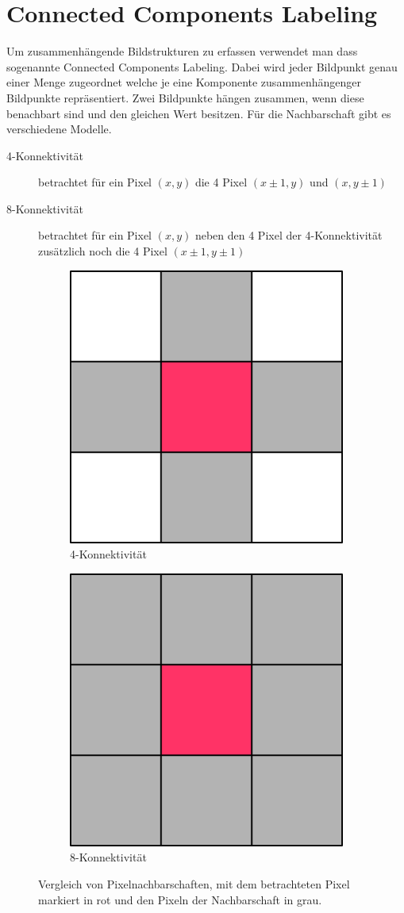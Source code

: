 \section{Connected Components Labeling}
\writtenby{\dcauthornameewie}%
Um zusammenhängende Bildstrukturen zu erfassen verwendet man dass sogenannte Connected Components Labeling.
Dabei wird jeder Bildpunkt genau einer Menge zugeordnet welche je eine Komponente zusammenhängenger Bildpunkte repräsentiert.
Zwei Bildpunkte hängen zusammen, wenn diese benachbart sind und den gleichen Wert besitzen.
Für die Nachbarschaft gibt es verschiedene Modelle.
%
\begin{description}
\item[4-Konnektivität] betrachtet für ein Pixel $(x,y)$ die 4 Pixel $(x\pm1,y)$ und $(x,y\pm1)$
\item[8-Konnektivität] betrachtet für ein Pixel $(x,y)$ neben den 4 Pixel der 4-Konnektivität zusätzlich noch die 4 Pixel $(x\pm1,y\pm1)$
\end{description}
%
\begin{figure}[H]
  \centering
  \begin{subfigure}{0.3\columnwidth}
    \centering
    \includegraphics[width=0.5\columnwidth]{img/basics/connected-compontents/4-connectivity}
    \caption{4-Konnektivität}
  \end{subfigure}
  \begin{subfigure}{0.3\columnwidth}
    \centering
    \includegraphics[width=0.5\columnwidth]{img/basics/connected-compontents/8-connectivity}
    \caption{8-Konnektivität}
  \end{subfigure}
  \caption[Vergleich von Pixelnachbarschaften]{Vergleich von Pixelnachbarschaften, mit dem betrachteten Pixel markiert in rot und den Pixeln der Nachbarschaft in grau.}
\end{figure}
